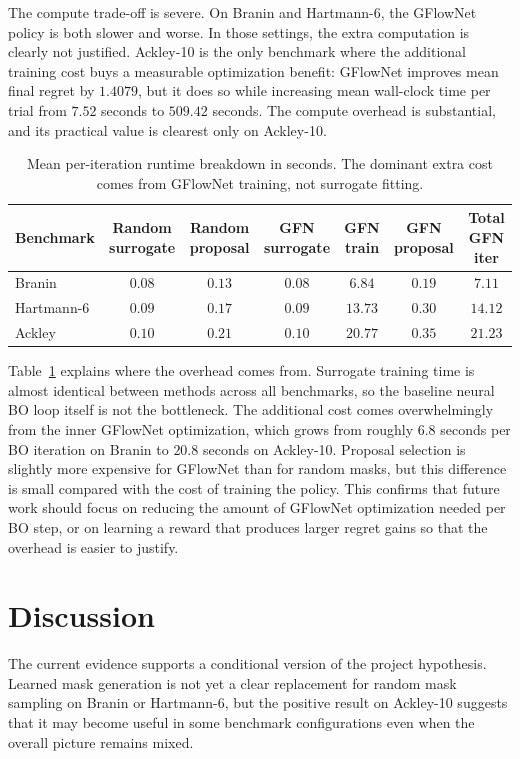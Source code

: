 \documentclass{article}
\begin{document}
The compute trade-off is severe. On Branin and Hartmann-6, the GFlowNet policy is both slower and worse. In those settings, the extra computation is clearly not justified. Ackley-10 is the only benchmark where the additional training cost buys a measurable optimization benefit: GFlowNet improves mean final regret by $1.4079$, but it does so while increasing mean wall-clock time per trial from $7.52$ seconds to $509.42$ seconds. The compute overhead is substantial, and its practical value is clearest only on Ackley-10.

\begin{table}[t]
\centering
\caption{Mean per-iteration runtime breakdown in seconds. The dominant extra cost comes from GFlowNet training, not surrogate fitting.}
\label{tab:runtime_breakdown}
\small
\begin{tabular}{lcccccc}
\toprule
Benchmark & Random surrogate & Random proposal & GFN surrogate & GFN train & GFN proposal & Total GFN iter \\
\midrule
Branin & $0.08$ & $0.13$ & $0.08$ & $6.84$ & $0.19$ & $7.11$ \\
Hartmann-6 & $0.09$ & $0.17$ & $0.09$ & $13.73$ & $0.30$ & $14.12$ \\
Ackley & $0.10$ & $0.21$ & $0.10$ & $20.77$ & $0.35$ & $21.23$ \\
\bottomrule
\end{tabular}
\end{table}

Table~\ref{tab:runtime_breakdown} explains where the overhead comes from. Surrogate training time is almost identical between methods across all benchmarks, so the baseline neural BO loop itself is not the bottleneck. The additional cost comes overwhelmingly from the inner GFlowNet optimization, which grows from roughly $6.8$ seconds per BO iteration on Branin to $20.8$ seconds on Ackley-10. Proposal selection is slightly more expensive for GFlowNet than for random masks, but this difference is small compared with the cost of training the policy. This confirms that future work should focus on reducing the amount of GFlowNet optimization needed per BO step, or on learning a reward that produces larger regret gains so that the overhead is easier to justify.

\section{Discussion}

The current evidence supports a conditional version of the project hypothesis. Learned mask generation is not yet a clear replacement for random mask sampling on Branin or Hartmann-6, but the positive result on Ackley-10 suggests that it may become useful in some benchmark configurations even when the overall picture remains mixed.
\end{document}
